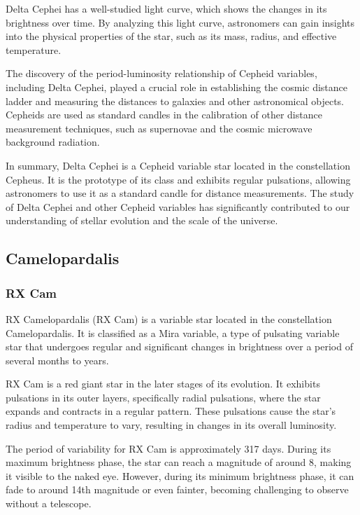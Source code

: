 Delta Cephei has a well-studied light curve, which shows the changes in its brightness over time. By analyzing this light curve, astronomers can gain insights into the physical properties of the star, such as its mass, radius, and effective temperature.

The discovery of the period-luminosity relationship of Cepheid variables, including Delta Cephei, played a crucial role in establishing the cosmic distance ladder and measuring the distances to galaxies and other astronomical objects. Cepheids are used as standard candles in the calibration of other distance measurement techniques, such as supernovae and the cosmic microwave background radiation.

In summary, Delta Cephei is a Cepheid variable star located in the constellation Cepheus. It is the prototype of its class and exhibits regular pulsations, allowing astronomers to use it as a standard candle for distance measurements. The study of Delta Cephei and other Cepheid variables has significantly contributed to our understanding of stellar evolution and the scale of the universe.


\subsection{Camelopardalis}


\subsubsection*{ RX Cam }
RX Camelopardalis (RX Cam) is a variable star located in the constellation Camelopardalis. It is classified as a Mira variable, a type of pulsating variable star that undergoes regular and significant changes in brightness over a period of several months to years.

RX Cam is a red giant star in the later stages of its evolution. It exhibits pulsations in its outer layers, specifically radial pulsations, where the star expands and contracts in a regular pattern. These pulsations cause the star's radius and temperature to vary, resulting in changes in its overall luminosity.

The period of variability for RX Cam is approximately 317 days. During its maximum brightness phase, the star can reach a magnitude of around 8, making it visible to the naked eye. However, during its minimum brightness phase, it can fade to around 14th magnitude or even fainter, becoming challenging to observe without a telescope.

